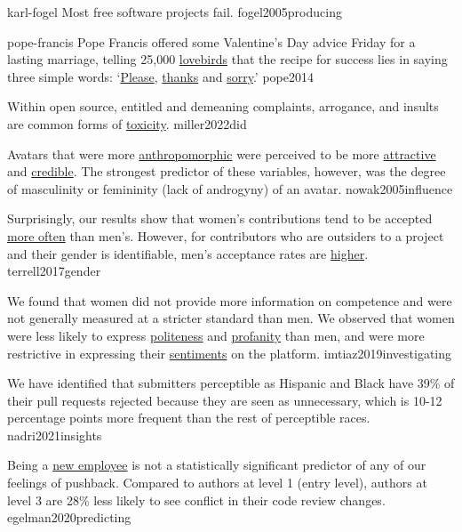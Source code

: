 \documentclass{article}
\begin{document}



\qte
  {karl-fogel}
  {Most free software projects fail.}
  {fogel2005producing}

\qte
  {pope-francis}
  {Pope Francis offered some Valentine’s Day advice Friday for a lasting marriage, telling 25,000 \ul{lovebirds} that the recipe for success lies in saying three simple words: `\ul{Please}, \ul{thanks} and \ul{sorry}.'{}}
  {pope2014}

  {Within open source, entitled and demeaning complaints, arrogance, and insults are common forms of \ul{toxicity}.}
  {miller2022did}

  {Avatars that were more \ul{anthropomorphic} were perceived to be more \ul{attractive} and \ul{credible}. The strongest predictor of these variables, however, was the degree of masculinity or femininity (lack of androgyny) of an avatar.}
  {nowak2005influence}

  {Surprisingly, our results show that women's contributions tend to be accepted \ul{more often} than men’s. However, for contributors who are outsiders to a project and their gender is identifiable, men's acceptance rates are \ul{higher}.}
  {terrell2017gender}

  {We found that women did not provide more information on competence and were not generally measured at a stricter standard than men. We observed that women were less likely to express \ul{politeness} and \ul{profanity} than men, and were more restrictive in expressing their \ul{sentiments} on the platform.}
  {imtiaz2019investigating}

  {We have identified that submitters perceptible as Hispanic and Black have 39\% of their pull requests rejected because they are seen as unnecessary, which is 10-12 percentage points more frequent than the rest of perceptible races.}
  {nadri2021insights}

  {Being a \ul{new employee} is not a statistically significant predictor of any of our feelings of pushback. Compared to authors at level 1 (entry level), authors at level 3 are 28\% less likely to see conflict in their code review changes.}
  {egelman2020predicting}
\end{document}
